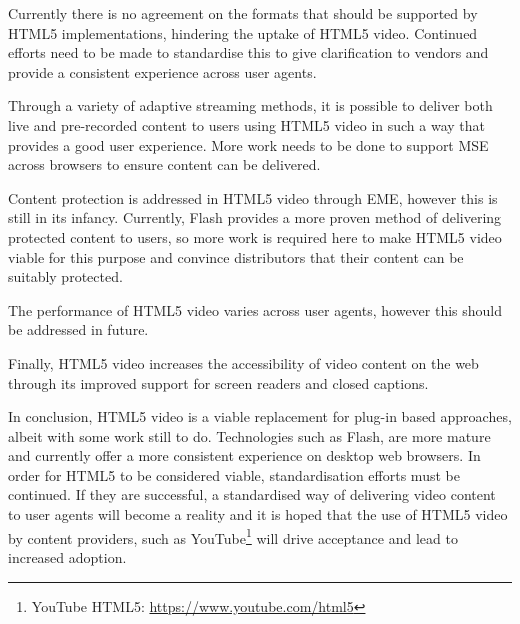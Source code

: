 \documentclass[journal]{IEEEtran}
\begin{document}
Currently there is no agreement on the formats that should be supported by HTML5 implementations, hindering the uptake of HTML5 video. Continued efforts need to be made to standardise this to give clarification to vendors and provide a consistent experience across user agents.

Through a variety of adaptive streaming methods, it is possible to deliver both live and pre-recorded content to users using HTML5 video in such a way that provides a good user experience. More work needs to be done to support MSE across browsers to ensure content can be delivered.

Content protection is addressed in HTML5 video through EME, however this is still in its infancy. Currently, Flash provides a more proven method of delivering protected content to users, so more work is required here to make HTML5 video viable for this purpose and convince distributors that their content can be suitably protected.

The performance of HTML5 video varies across user agents, however this should be addressed in future.

Finally, HTML5 video increases the accessibility of video content on the web through its improved support for screen readers and closed captions.

In conclusion, HTML5 video is a viable replacement for plug-in based approaches, albeit with some work still to do. Technologies such as Flash, are more mature and currently offer a more consistent experience on desktop web browsers. In order for HTML5 to be considered viable, standardisation efforts must be continued. If they are successful, a standardised way of delivering video content to user agents will become a reality and it is hoped that the use of HTML5 video by content providers, such as YouTube\footnote{YouTube HTML5: \url{https://www.youtube.com/html5}} will drive acceptance and lead to increased adoption.

%
%
\end{document}
